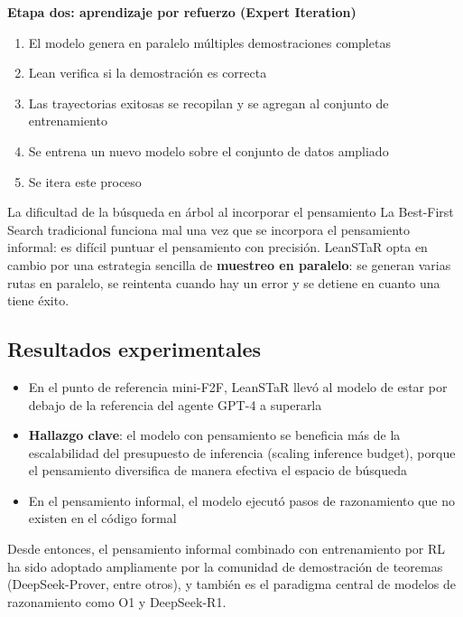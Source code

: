 \documentclass[a4paper]{article}
\begin{document}
\textbf{Etapa dos: aprendizaje por refuerzo (Expert Iteration)}
\begin{enumerate}
    \item El modelo genera en paralelo múltiples demostraciones completas
    \item Lean verifica si la demostración es correcta
    \item Las trayectorias exitosas se recopilan y se agregan al conjunto de entrenamiento
    \item Se entrena un nuevo modelo sobre el conjunto de datos ampliado
    \item Se itera este proceso
\end{enumerate}

\begin{warningbox}{La dificultad de la búsqueda en árbol al incorporar el pensamiento}
La Best-First Search tradicional funciona mal una vez que se incorpora el pensamiento informal: es difícil puntuar el pensamiento con precisión. LeanSTaR opta en cambio por una estrategia sencilla de \textbf{muestreo en paralelo}: se generan varias rutas en paralelo, se reintenta cuando hay un error y se detiene en cuanto una tiene éxito.
\end{warningbox}

\subsection{Resultados experimentales}

\begin{itemize}
    \item En el punto de referencia mini-F2F, LeanSTaR llevó al modelo de estar por debajo de la referencia del agente GPT-4 a superarla
    \item \textbf{Hallazgo clave}: el modelo con pensamiento se beneficia más de la escalabilidad del presupuesto de inferencia (scaling inference budget), porque el pensamiento diversifica de manera efectiva el espacio de búsqueda
    \item En el pensamiento informal, el modelo ejecutó pasos de razonamiento que no existen en el código formal
\end{itemize}

Desde entonces, el pensamiento informal combinado con entrenamiento por RL ha sido adoptado ampliamente por la comunidad de demostración de teoremas (DeepSeek-Prover, entre otros), y también es el paradigma central de modelos de razonamiento como O1 y DeepSeek-R1.
\end{document}
